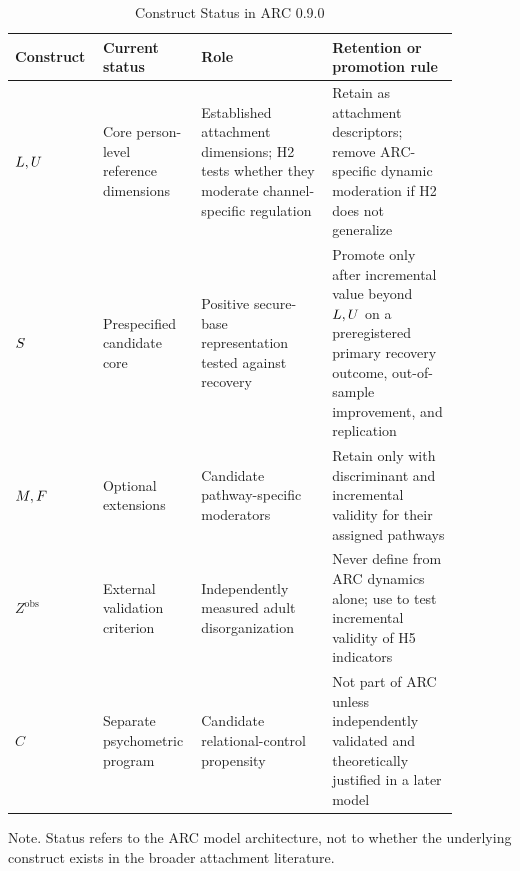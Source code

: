 \begin{table}[htbp]
\caption{Construct Status in ARC 0.9.0}
\label{tab:construct-status}
\centering
\small
\setlength{\tabcolsep}{3pt}
\renewcommand{\arraystretch}{0.95}
\begin{threeparttable}
\begin{tabular}{p{0.15\linewidth}p{0.17\linewidth}p{0.29\linewidth}p{0.27\linewidth}}
\toprule
Construct & Current status & Role & Retention or promotion rule \\
\midrule
\(L,U\) & Core person-level reference dimensions & Established attachment dimensions; H2 tests whether they moderate channel-specific regulation & Retain as attachment descriptors; remove ARC-specific dynamic moderation if H2 does not generalize \\
\(S\) & Prespecified candidate core & Positive secure-base representation tested against recovery & Promote only after incremental value beyond \(L,U\) on a preregistered primary recovery outcome, out-of-sample improvement, and replication \\
\(M,F\) & Optional extensions & Candidate pathway-specific moderators & Retain only with discriminant and incremental validity for their assigned pathways \\
\(Z^{\mathrm{obs}}\) & External validation criterion & Independently measured adult disorganization & Never define from ARC dynamics alone; use to test incremental validity of H5 indicators \\
\(C\) & Separate psychometric program & Candidate relational-control propensity & Not part of ARC unless independently validated and theoretically justified in a later model \\
\bottomrule
\end{tabular}
\begin{tablenotes}[flushleft]
\footnotesize
\item Note. Status refers to the ARC model architecture, not to whether the underlying construct exists in the broader attachment literature.
\end{tablenotes}
\end{threeparttable}
\end{table}
